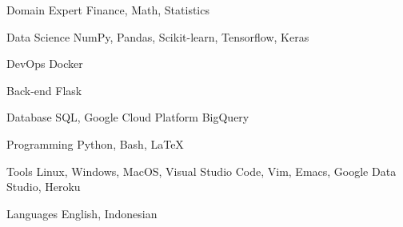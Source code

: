 

\begin{cvskills}

  \cvskill
    {Domain Expert} %
    {Finance, Math, Statistics} %

  \cvskill
    {Data Science} %
    {NumPy, Pandas, Scikit-learn, Tensorflow, Keras} %

  \cvskill
    {DevOps} %
    {Docker} %

  \cvskill
    {Back-end} %
    {Flask} %

  \cvskill
    {Database} %
    {SQL, Google Cloud Platform BigQuery} %

  \cvskill
    {Programming} %
    {Python, Bash, LaTeX} %

  \cvskill
    {Tools} %
    {Linux, Windows, MacOS, Visual Studio Code, Vim, Emacs, Google Data Studio, Heroku} %

  \cvskill
    {Languages} %
    {English, Indonesian} %

\end{cvskills}
